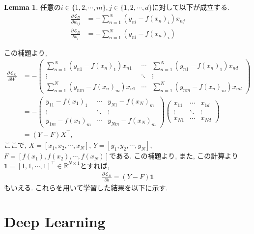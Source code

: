 \documentclass[11pt, a4paper, dvipdfmx]{jsarticle}
\theoremstyle{definition}
\newtheorem{Lemma+}[Axiom+]{Lemma}
\newcommand{\R}{\mathbb{R}}
\newcommand{\Loss}{\mathcal{L}_{D}}
\begin{document}
\begin{Lemma+}
    任意の$i\in\{1, 2, \cdots, m\}, j\in\{1, 2, \cdots, d\}$に対して以下が成立する.
    \begin{align*}
        \frac{\partial\Loss}{\partial w_{ij}} &= -\sum_{n = 1}^{N}\left(y_{ni} - f(x_{n})_{i}\right)x_{nj}\\
        \frac{\partial\Loss}{\partial b_{i}} &= -\sum_{n = 1}^{N}(y_{ni} - f(x_{n})_{i})
    \end{align*}
\end{Lemma+}
この補題より, 
\begin{align*}
    \frac{\partial\Loss}{\partial W} &= - 
    \begin{pmatrix}
        \sum_{n = 1}^{N}\left(y_{n1} - f(x_{n})_{1}\right)x_{n1} & \cdots & \sum_{n = 1}^{N}\left(y_{n1} - f(x_{n})_{1}\right)x_{nd}\\
        \vdots & \ddots & \vdots\\
        \sum_{n = 1}^{N}\left(y_{nm} - f(x_{n})_{m}\right)x_{n1} & \cdots & \sum_{n = 1}^{N}\left(y_{nm} - f(x_{n})_{m}\right)x_{nd}
    \end{pmatrix}\\ 
    & = - 
    \begin{pmatrix}
        y_{11} - f(x_1)_1 & \cdots & y_{N1} - f(x_N)_m\\
        \vdots & \ddots & \vdots\\
        y_{1m} - f(x_1)_m & \cdots & y_{Nm} - f(x_N)_m
    \end{pmatrix}
    \begin{pmatrix}
        x_{11} & \cdots & x_{1d} \\
        \vdots & \ddots & \vdots \\
        x_{N1} & \cdots & x_{Nd}
    \end{pmatrix}\\
    &= (Y - F)X^{\top},
\end{align*}
ここで, $X = [x_{1}, x_{2}, \cdots, x_{N}]$, $Y = [y_1, y_2, \cdots, y_N]$, $F = [f(x_1), f(x_2), \cdots, f(x_N)]$である. この補題より, 
また, この計算より$\mathbf{1} = [1, 1, \cdots, 1]^{\top}\in\R^{N\times 1}$とすれば,
\begin{align*}
    \frac{\partial\Loss}{\partial b} = (Y - F)\mathbf{1}
\end{align*}
もいえる. これらを用いて学習した結果を以下に示す. 
\section{Deep Learning}
\end{document}
